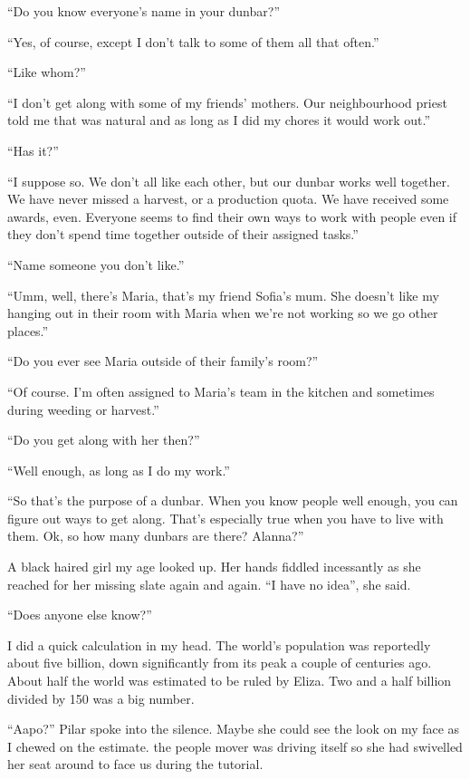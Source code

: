 ``Do you know everyone's name in your dunbar?''

``Yes, of course, except I don't talk to some of them all that often.''

``Like whom?''

``I don't get along with some of my friends' mothers. Our neighbourhood priest told me that was natural and as long as I did my chores it would work out.''

``Has it?''

``I suppose so. We don't all like each other, but our dunbar works well together. We have never missed a harvest, or a production quota. We have received some awards, even. Everyone seems to find their own ways to work with people even if they don't spend time together outside of their assigned tasks.''

``Name someone you don't like.''

``Umm, well, there's Maria, that's my friend Sofia's mum. She doesn't like my hanging out in their room with Maria when we're not working so we go other places.''

``Do you ever see Maria outside of their family's room?''

``Of course. I'm often assigned to Maria's team in the kitchen and sometimes during weeding or harvest.''

``Do you get along with her then?''

``Well enough, as long as I do my work.''

``So that's the purpose of a dunbar. When you know people well enough, you can figure out ways to get along. That's especially true when you have to live with them.  Ok, so how many dunbars are there? Alanna?''

A black haired girl my age looked up. Her hands fiddled incessantly as she reached for her missing slate again and again. ``I have no idea'', she said.

``Does anyone else know?''

I did a quick calculation in my head. The world's population was reportedly about five billion, down significantly from its peak a couple of centuries ago. About half the world was estimated to be ruled by Eliza. Two and a half billion divided by 150 was a big number.

``Aapo?'' Pilar spoke into the silence. Maybe she could see the look on my face as I chewed on the estimate. the people mover was driving itself so she had swivelled her seat around to face us during the tutorial.

